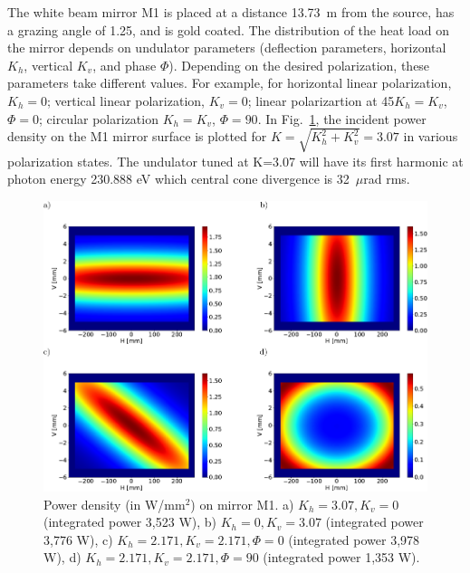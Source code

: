 \documentclass{iucr}
\begin{document}
The white beam mirror M1 is placed at a distance 13.73~m from the source, has a grazing angle of 1.25\textdegree, and is gold coated. The distribution of the heat load on the mirror depends on undulator parameters (deflection parameters, horizontal $K_h$, vertical $K_v$, and phase $\Phi$). Depending on the desired polarization, these parameters take different values. For example, for horizontal linear polarization, $K_h=0$; vertical linear polarization, $K_v=0$; linear polarizartion at 45\textdegree $K_h=K_v$, $\Phi=0$; circular polarization $K_h=K_v$, $\Phi=90$\textdegree. In Fig.~\ref{fig:M1powerdensity}, the incident power density on the M1 mirror surface is plotted for $K=\sqrt{K_h^2 + K_v^2}=3.07$ in various polarization states. The undulator tuned at K=3.07 will have its first harmonic at photon energy 230.888 eV which central cone divergence is 32~$\mu$rad rms.

\begin{figure} 
\label{fig:M1powerdensity}
   \includegraphics[width=1.0\textwidth]{figures/fig1.pdf} 
\caption
{Power density (in W/mm$^2$) on mirror M1.
a) $K_h=3.07, K_v=0$ (integrated power 3,523 W),
b) $K_h=0,K_v=3.07$ (integrated power 3,776 W),
c) $K_h=2.171,K_v=2.171, \Phi=0$ \textdegree (integrated power 3,978 W),
d) $K_h=2.171,K_v=2.171, \Phi=90$ \textdegree (integrated power 1,353 W).
}
\end{figure} 
\end{document}
